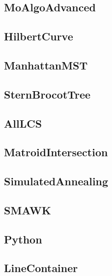 \subsection{MoAlgoAdvanced}

\subsection{HilbertCurve}

\subsection{ManhattanMST}

\subsection{SternBrocotTree}

\subsection{AllLCS}

\subsection{MatroidIntersection}

\subsection{SimulatedAnnealing}

\subsection{SMAWK}

\subsection{Python}

\subsection{LineContainer}

